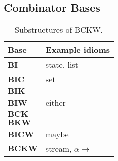 \subsection{Combinator Bases}\label{subsec:combinator-bases}

\begin{table}\centering
\begin{tabular}{ll}
Base & Example idioms \\
\hline
$\mathbf{BI}$ & state, list \\
$\mathbf{BIC}$ & set \\
$\mathbf{BIK}$ & \\
$\mathbf{BIW}$ & either \\
$\mathbf{BCK}$ & \\
$\mathbf{BKW}$ & \\
$\mathbf{BICW}$ & maybe \\
$\mathbf{BCKW}$ & stream, $\alpha \to$ \\
\end{tabular}
\caption{Substructures of BCKW.}
\label{tab:combinator-bases}
\end{table}

\todo
